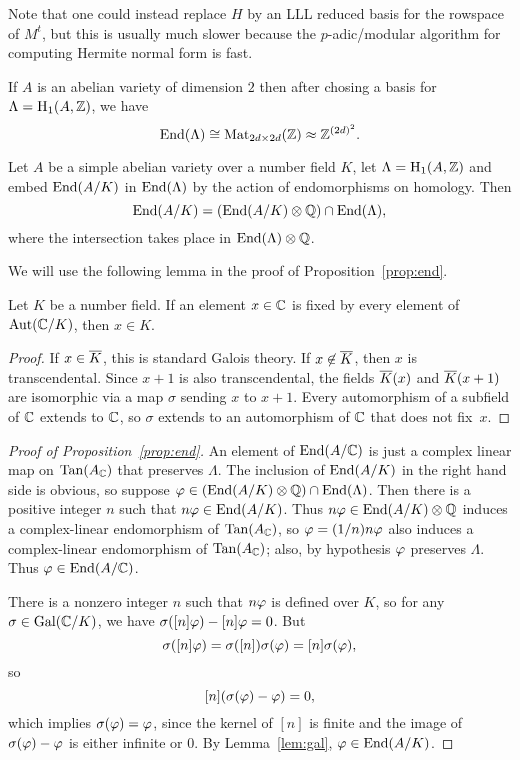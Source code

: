 \documentclass{article}
\begin{document}
Note that one could instead replace $H$ by an LLL reduced basis for
the rowspace of $M^t$, but this is usually much slower because the
$p$-adic/modular algorithm \cite{blah} for computing Hermite normal
form is fast.


If $A$ is an abelian variety of dimension $2$ then after chosing a basis for
$\Lambda = \operatorname{H}_1(A,\mathbb{Z})$, we have
$$
  \operatorname{End}(\Lambda)\cong \operatorname{Mat}_{2d\times 2d}(\mathbb{Z}) \approx \mathbb{Z}^{(2d)^2}.
$$

\begin{proposition}\label{prop:end}
Let $A$ be a simple abelian variety over a number field $K$,
let $\Lambda = \operatorname{H}_1(A,\mathbb{Z})$ and
embed $\operatorname{End}(A/K)$ in $\operatorname{End}(\Lambda)$
by the action of endomorphisms on homology.   Then
$$
  \operatorname{End}(A/K) = (\operatorname{End}(A/K)\otimes \mathbb{Q})\cap \operatorname{End}(\Lambda),
$$
where  the intersection takes place in $\operatorname{End}(\Lambda)\otimes\mathbb{Q}$.
\end{proposition}
We will use the following lemma in the proof of Proposition~\ref{prop:end}.
\begin{lemma}\label{lem:gal}
  Let $K$ be a number field.  If an element $x\in \mathbb{C}$ is fixed by
  every element of $\operatorname{Aut}(\mathbb{C}/K)$, then $x\in K$.
\end{lemma}
\begin{proof}
  If $x\in\overline{K}$, this is standard Galois theory.  If $x\not\in
  \overline{K}$, then $x$ is transcendental.  Since $x+1$ is also transcendental,
the fields $\overline{K}(x)$ and $\overline{K}(x+1)$ are isomorphic via a map $\sigma$
sending $x$ to $x+1$.  Every automorphism of a subfield of $\mathbb{C}$
extends to $\mathbb{C}$, so $\sigma$ extends to an automorphism of $\mathbb{C}$
that does not fix~$x$.
\end{proof}

\begin{proof}[Proof of Proposition~\ref{prop:end}]
An element of $\operatorname{End}(A/\mathbb{C})$ is just
a complex linear map on $\operatorname{Tan}(A_{\mathbb{C}})$  that preserves $\Lambda$.
The inclusion of $\operatorname{End}(A/K)$ in the right hand side is obvious,
so suppose $\varphi \in (\operatorname{End}(A/K)\otimes \mathbb{Q})\cap \operatorname{End}(\Lambda)$.
Then there is a positive integer $n$ such that $n\varphi\in \operatorname{End}(A/K)$.
Thus $n\varphi\in \operatorname{End}(A/K)\otimes\mathbb{Q}$ induces a complex-linear endomorphism of $\operatorname{Tan}(A_{\mathbb{C}})$,
so $\varphi = (1/n)n\varphi $ also induces a complex-linear endomorphism of $\operatorname{Tan}(A_{\mathbb{C}})$;
also, by hypothesis $\varphi$ preserves $\Lambda$.
Thus $\varphi\in\operatorname{End}(A/\mathbb{C})$.

There is a nonzero integer $n$ such that $n\varphi$ is defined over $K$,
so for any $\sigma\in\operatorname{Gal}(\mathbb{C}/K)$, we have $\sigma([n]\varphi) - [n]\varphi
= 0$.  But
$$\sigma([n]\varphi) = \sigma([n])\sigma(\varphi) = [n]\sigma(\varphi),$$
so
$$[n](\sigma(\varphi) - \varphi) = 0,$$
which implies $\sigma(\varphi)=\varphi$, since the kernel of $[n]$ is
finite and the image of $\sigma(\varphi)-\varphi$ is either infinite or
$0$.  By Lemma~\ref{lem:gal}, $\varphi\in \operatorname{End}(A/K)$.
\end{proof}
\end{document}
